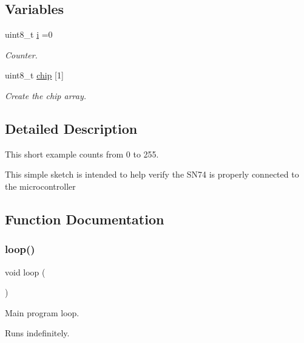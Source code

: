 \subsection*{Variables}
\begin{DoxyCompactItemize}
\item 
uint8\+\_\+t \hyperlink{SN74__Count_8ino_af27e3188294c2df66d975b74a09c001d}{i} =0
\begin{DoxyCompactList}\small\item\em Counter. \end{DoxyCompactList}\item 
uint8\+\_\+t \hyperlink{SN74__Count_8ino_a089fa212b87b3656b0a264a5e4457d8e}{chip} \mbox{[}1\mbox{]}
\begin{DoxyCompactList}\small\item\em Create the chip array. \end{DoxyCompactList}\end{DoxyCompactItemize}


\subsection{Detailed Description}
This short example counts from 0 to 255. 

This simple sketch is intended to help verify the S\+N74 is properly connected to the microcontroller 

\subsection{Function Documentation}
\mbox{\label{SN74__Count_8ino_afe461d27b9c48d5921c00d521181f12f}} 
\subsubsection{\texorpdfstring{loop()}{loop()}}
{\footnotesize\ttfamily void loop (\begin{DoxyParamCaption}{ }\end{DoxyParamCaption})}



Main program loop. 

Runs indefinitely. \mbox{\label{SN74__Count_8ino_a4fc01d736fe50cf5b977f755b675f11d}} 
